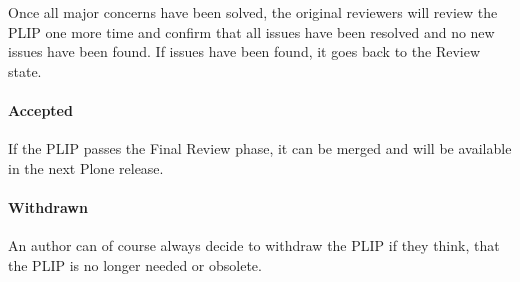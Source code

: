 Once all major concerns have been solved, the original reviewers will review
the \ac{PLIP} one more time and confirm that all issues have been resolved and
no new issues have been found. If issues have been found, it goes back to the
Review state.

\paragraph{Accepted}

If the \ac{PLIP} passes the Final Review phase, it can be merged and will be
available in the next Plone release.

\paragraph{Withdrawn}

An author can of course always decide to withdraw the \ac{PLIP} if they think,
that the \ac{PLIP} is no longer needed or obsolete.


